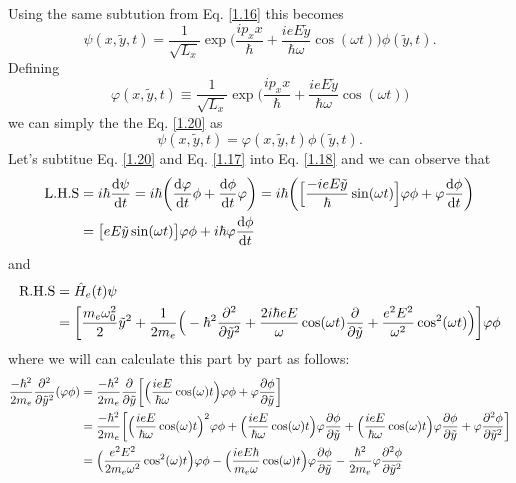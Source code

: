 Using the same subtution from Eq. \eqref{1.16} this becomes
\begin{equation} \label{1.20}
    \psi(x,\tilde{y},t) = \frac{1}{\sqrt{L_x}} \exp\bigg(
      \frac{ip_x x}{\hbar} +
      \frac{ieE\tilde{y}}{\hbar \omega}\cos(\omega t)
    \bigg) \phi(\tilde{y},t).
\end{equation}
Defining
\begin{equation} \label{1.21}
    \varphi(x,\tilde{y},t) \equiv \frac{1}{\sqrt{L_x}} \exp\bigg(
      \frac{ip_x x}{\hbar} +
      \frac{ieE\tilde{y}}{\hbar \omega}\cos(\omega t)
    \bigg)
\end{equation}
we can simply the the Eq. \eqref{1.20} as
\begin{equation} \label{1.22}
    \psi(x,\tilde{y},t) = \varphi(x,\tilde{y},t) \phi(\tilde{y},t).
\end{equation}
Let's subtitue Eq. \eqref{1.20} and Eq. \eqref{1.17} into Eq. \eqref{1.18} and we can observe that
\begin{equation} \label{1.23}
  \begin{aligned}
    \text{L.H.S} & = i \hbar \dv{\psi}{t} =
    i \hbar \bigg( \dv{\varphi}{t} \phi + \dv{\phi}{t} \varphi \bigg) =
    i \hbar \bigg(
      \Big[\frac{-ieE\tilde{y}}{\hbar}\sin(\omega t)\Big]\varphi\phi +
      \varphi  \dv{\phi}{t}
    \bigg) \\
    & =
    \big[{eE\tilde{y}}\sin(\omega t)\big]\varphi\phi +
    i \hbar\varphi  \dv{\phi}{t}
  \end{aligned}
\end{equation}
and
\begin{equation} \label{1.24}
  \begin{aligned}
    \text{R.H.S} & = \hat{H}_e(t)\psi \\
    & =
    \bigg[
    \frac{m_e \omega_0^2}{2}\tilde{y}^2 +
    \frac{1}{2m_e}\Big(
    -\hbar^2 \pdv[2]{\tilde{y}} +
    \frac{2i\hbar eE}{\omega}\cos(\omega t) \pdv{\tilde{y}}+
    \frac{e^2E^2}{\omega^2}\cos[2](\omega t)
    \Big) \bigg]
    \varphi\phi
  \end{aligned}
\end{equation}
where we will can calculate this part by part as follows:
\begin{equation} \label{1.25}
  \begin{aligned}
    \frac{-\hbar^2}{2m_e}\pdv[2]{\tilde{y}}(\varphi\phi) & =
    \frac{-\hbar^2}{2m_e} \pdv{\tilde{y}}\bigg[
      \Big(\frac{ieE}{\hbar \omega} \cos(\omega)t\Big)\varphi\phi +
      \varphi\pdv{\phi}{\tilde{y}}
    \bigg] \\
    & =
    \frac{-\hbar^2}{2m_e} \bigg[
      \Big(\frac{ieE}{\hbar \omega} \cos(\omega)t\Big)^2\varphi\phi +
      \Big(\frac{ieE}{\hbar \omega} \cos(\omega)t\Big)\varphi\pdv{\phi}{\tilde{y}} +
      \Big(\frac{ieE}{\hbar \omega} \cos(\omega)t\Big)\varphi\pdv{\phi}{\tilde{y}} +
      \varphi\pdv[2]{\phi}{\tilde{y}}
    \bigg] \\
    & =
    \Big(\frac{e^2E^2}{ 2m_e\omega^2} \cos[2](\omega)t\Big)\varphi\phi -
    \Big(\frac{ieE \hbar}{m_e\omega} \cos(\omega)t\Big)\varphi\pdv{\phi}{\tilde{y}} -
    \frac{\hbar^2}{2m_e}
    \varphi\pdv[2]{\phi}{\tilde{y}}
  \end{aligned}
\end{equation}
